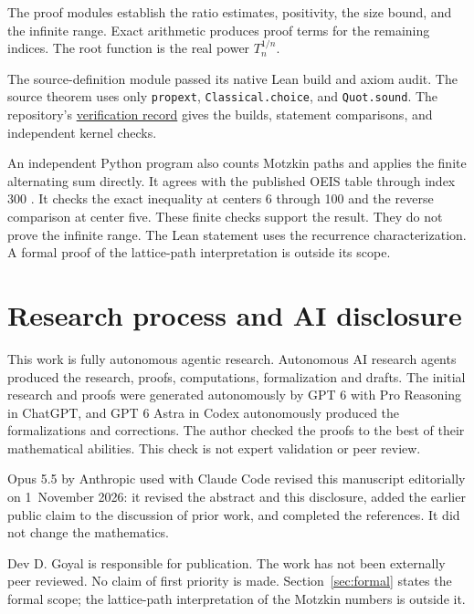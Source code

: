 \documentclass[11pt]{article}
\begin{document}
The proof modules establish the ratio estimates, positivity, the size
bound, and the infinite range. Exact arithmetic produces proof terms for
the remaining indices. The root function is the real power $T_n^{1/n}$.

The source-definition module passed its native Lean build and axiom audit.
The source theorem uses only \texttt{propext}, \texttt{Classical.choice},
and \texttt{Quot.sound}. The repository's
\href{https://github.com/dvgyl/math-and-theory/blob/main/verification/summary.md}{verification record}
gives the builds, statement comparisons, and independent kernel checks.

An independent Python program also counts Motzkin paths and applies the
finite alternating sum directly. It agrees with the published OEIS table
through index 300 \cite{OEIS}. It checks the exact inequality at centers
6 through 100 and the reverse comparison at center five. These finite
checks support the result. They do not prove the infinite range.
The Lean statement uses the recurrence characterization. A formal proof
of the lattice-path interpretation is outside its scope.

\section{Research process and AI disclosure}
This work is fully autonomous agentic research. Autonomous AI research agents produced the research, proofs, computations, formalization and drafts. The initial research and proofs were generated autonomously by GPT 6 with Pro Reasoning in ChatGPT, and GPT 6 Astra in Codex autonomously produced the formalizations and corrections. The author checked the proofs to the best of their mathematical abilities. This check is not expert validation or peer review.

Opus 5.5 by Anthropic used with Claude Code revised this manuscript editorially on 1~November 2026: it revised the abstract and this disclosure, added the earlier public claim \cite{P} to the discussion of prior work, and completed the references. It did not change the mathematics.

Dev D. Goyal is responsible for publication. The work has not been externally peer reviewed. No claim of first priority is made. Section~\ref{sec:formal} states the formal scope; the lattice-path interpretation of the Motzkin numbers is outside it.



\end{document}
